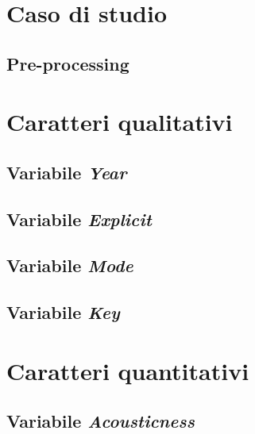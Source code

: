 \documentclass[fleqn,10pt]{SelfArx} %
\affiliation{\textsuperscript{1}\textit{794126, Dipartimento di Informatica, Sistemistica e Comunicazione}} %
\begin{document}
\flushbottom %

\maketitle %

\tableofcontents %

\thispagestyle{empty} %


\section{Caso di studio}
\subsection{Pre-processing}
\section{Caratteri qualitativi}
\subsection*{Variabile \textit{Year}}
\subsection*{Variabile \textit{Explicit}}
\subsection*{Variabile \textit{Mode}}
\subsection*{Variabile \textit{Key}}
\section{Caratteri quantitativi}
\subsection*{Variabile \textit{Acousticness}}
\end{document}
